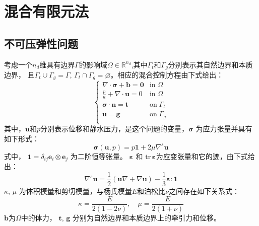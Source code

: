 \chapter{混合有限元法}

\section{不可压弹性问题}               
考虑一个$n_d$维具有边界$\Gamma$的影响域$\Omega\in \mathbb R^{n_d}$,其中$\Gamma_t$和$\Gamma_g$分别表示其自然边界和本质边界，
且$\Gamma_t \cup \Gamma_g = \Gamma$, $\Gamma_t \cap \Gamma_g = \varnothing$。相应的混合控制方程由下式给出：
\begin{equation}\label{strong}
    \begin{cases}
        \nabla \cdot \boldsymbol \sigma + \boldsymbol b = \boldsymbol 0 & \mathrm{in} \; \Omega \\
        \frac{p}{\kappa} + \nabla \cdot \boldsymbol u = 0 & \mathrm{in} \; \Omega \\
        \boldsymbol \sigma \cdot \boldsymbol n = \boldsymbol t & \mathrm{on} \; \Gamma_t \\
        \boldsymbol u = \boldsymbol g & \mathrm{on} \; \Gamma_g \\
    \end{cases}
\end{equation}
其中，$\boldsymbol u$和$p$分别表示位移和静水压力，是这个问题的变量，$\boldsymbol \sigma$ 为应力张量并具有如下形式：
\begin{equation}\label{stress}
    \boldsymbol \sigma(\boldsymbol u, p) = p \boldsymbol 1 + 2\mu \nabla^s \boldsymbol u
\end{equation}
式中， $\boldsymbol 1 = \delta_{ij} \boldsymbol e_i \otimes \boldsymbol e_j$ 为二阶恒等张量。
$\boldsymbol \varepsilon$ 和 $\mathrm{tr}\,\boldsymbol \varepsilon$为应变张量和它的迹，由下式给出：
\begin{equation}
    \nabla^s \boldsymbol u = \frac{1}{2}(\boldsymbol u \nabla + \nabla \boldsymbol u) -\frac{1}{3} \boldsymbol \varepsilon : \boldsymbol 1
\end{equation}
$\kappa$, $\mu$ 为体积模量和剪切模量，与杨氏模量$E$和泊松比$\nu$之间存在如下关系式：
\begin{equation}\label{modulus}
    \kappa = \frac{E}{2(1-2\nu)}, \quad \mu = \frac{E}{2(1+\nu)}
\end{equation}
$\boldsymbol b$为$\Omega$中的体力， $\boldsymbol t$, $\boldsymbol g$ 分别为自然边界和本质边界上的牵引力和位移。

